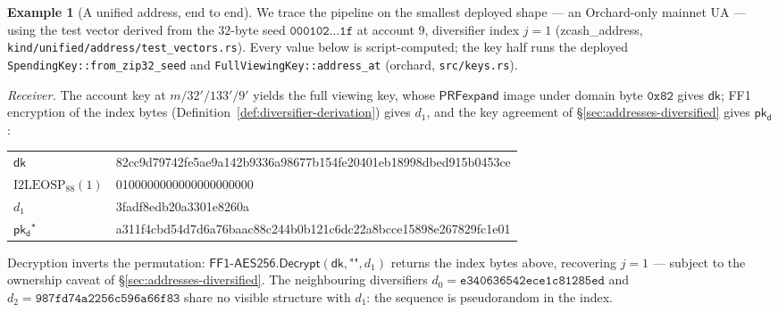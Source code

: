 \documentclass[11pt,a4paper]{article}
\theoremstyle{definition}
\newtheorem{example}[theorem]{Example}
\newcommand{\dk}{\ensuremath{\mathsf{dk}}}
\newcommand{\pkd}{\ensuremath{\mathsf{pk_d}}}
\begin{document}
\begin{example}[A unified address, end to end]\label{ex:ua-trace}
We trace the pipeline on the smallest deployed shape --- an Orchard-only
mainnet UA --- using the test vector derived from the $32$-byte seed
$\mathtt{000102 \ldots 1f}$ at account $9$, diversifier index $j = 1$
(\textsf{zcash\_address},
\texttt{kind/unified/address/test\_vectors.rs}). Every value below is
script-computed; the key half runs the deployed
\texttt{SpendingKey::from\_zip32\_seed} and
\texttt{FullViewingKey::address\_at} (\textsf{orchard},
\texttt{src/keys.rs}).

\emph{Receiver.} The account key at $m/32'/133'/9'$ yields the full
viewing key, whose $\mathsf{PRFexpand}$ image under domain byte
$\mathtt{0x82}$ gives $\dk$; FF1 encryption of the index bytes
(Definition~\ref{def:diversifier-derivation}) gives $d_1$, and the key
agreement of \S\ref{sec:addresses-diversified} gives $\pkd$:
\begin{center}\footnotesize\ttfamily
\begin{tabular}{@{}l@{\quad}l@{}}
$\dk$ & 82cc9d79742fe5ae9a142b9336a98677b154fe20401eb18998dbed915b0453ce \\
$\mathrm{I2LEOSP}_{88}(1)$ & 0100000000000000000000 \\
$d_1$ & 3fadf8edb20a3301e8260a \\
$\pkd^\star$ & a311f4cbd54d7d6a76baac88c244b0b121c6dc22a8bcce15898e267829fc1e01 \\
\end{tabular}
\end{center}
Decryption inverts the permutation:
$\mathsf{FF1\text{-}AES256.Decrypt}(\dk, \texttt{""}, d_1)$ returns the
index bytes above, recovering $j = 1$ --- subject to the ownership caveat
of \S\ref{sec:addresses-diversified}. The neighbouring diversifiers
$d_0 = \mathtt{e340636542ece1c81285ed}$ and
$d_2 = \mathtt{987fd74a2256c596a66f83}$ share no visible structure with
$d_1$: the sequence is pseudorandom in the index.


\end{example}
\end{document}
